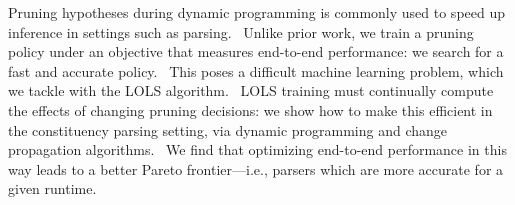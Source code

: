 Pruning hypotheses during dynamic programming is commonly used to speed up inference in settings such as parsing.  Unlike prior work, we train a pruning policy under an objective that measures end-to-end performance{:} we search for a fast and accurate policy.  This poses a difficult machine learning problem, which we tackle with the LOLS algorithm.  LOLS training must continually compute the effects of changing pruning decisions{:} we show how to make this efficient in the constituency parsing setting, via dynamic programming and change propagation algorithms.  We find that optimizing end-to-end performance in this way leads to a better Pareto frontier---i.e., parsers which are more accurate for a given runtime.